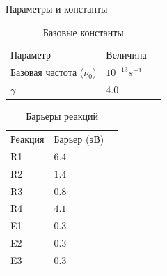 \documentclass{beamer}%
\begin{document}
\begin{frame}{Параметры и константы}
    \begin{table}
        \begin{tabular}{llc}
          Параметр & Величина\\ 
          Базовая частота (\(\nu _0\)) &
          \(10^{-13} s^{-1}\) \\
          \(\gamma\) & 4.0 \\
        \end{tabular}
        \caption{Базовые константы}
      \end{table}

      \begin{table}
        \begin{tabular}{llc}
          Реакция & Барьер (эВ) \\ 
          R1 &  \(6.4\) \\
          R2 &  \(1.4\) \\
          R3 &  \(0.8\) \\
          R4 &  \(4.1\) \\
          E1 &  \(0.3\) \\
          E2 &  \(0.3\) \\
          E3 &  \(0.3\) \\
        \end{tabular}
        \caption{Барьеры реакций}
      \end{table}


\end{frame}









\end{document}
